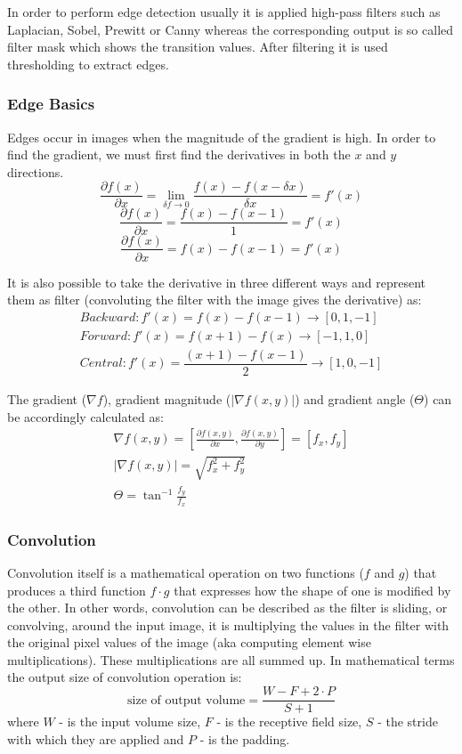 In order to perform edge detection usually it is applied high-pass filters such as Laplacian, Sobel, Prewitt or Canny whereas the corresponding output is so called filter mask which shows the transition values. After filtering it is used thresholding to extract edges.

\subsubsection{Edge Basics}
Edges occur in images when the magnitude of the gradient is high. In order to find the gradient, we must first find the derivatives in both the $x$ and $y$ directions.
\[ \frac{\partial f (x)}{\partial x} = \lim_{\delta{f} \to 0} \dfrac{f(x) - f(x - \delta x)}{\delta x}  = f'(x) \]
\[ \frac{\partial f (x)}{\partial x} = \dfrac{f(x) - f(x - 1)}{1}  = f'(x) \]
\[ \frac{\partial f (x)}{\partial x} = f(x) - f(x - 1) = f'(x) \]

It is also possible to take the derivative in three different ways and represent them as filter (convoluting the filter with the image gives the derivative) as:
\begin{align*}
Backward: f'(x) = f(x) - f(x - 1) \to [0, 1, -1] \\
Forward:  f'(x) = f(x + 1) - f(x) \to [-1, 1, 0] \\
Central:  f'(x) = \dfrac{(x + 1) - f(x - 1)}{2} \to [1, 0, -1]
\end{align*}

The gradient ($\nabla f$), gradient magnitude ($|\nabla f(x, y)|$) and gradient angle ($\Theta$) can be accordingly calculated as: 
\begin{align*}
\nabla f(x, y) = [ \frac{\partial{f (x, y)}}{\partial{x}}, \frac{\partial{f (x, y)}}{\partial{y}} ]  = [f_x, f_y] \\
|\nabla f(x, y)| = \sqrt{f^2_x + f^2_y} \\
\Theta = \tan^{-1} \frac{f_y}{f_x}
\end{align*}

\subsubsection{Convolution}
Convolution itself is a mathematical operation on two functions ($f$ and $g$) that produces a third function $f \cdot g$ that expresses how the shape of one is modified by the other. In other words, convolution can be described as the filter is sliding, or convolving, around the input image, it is multiplying the values in the filter with the original pixel values of the image (aka computing element wise multiplications). These multiplications are all summed up. In mathematical terms the output size of convolution operation is: \[ \text{size of output volume} = \frac{W-F+2 \cdot P}{S+1} \] where $W$ - is the input volume size, $F$ - is the receptive field size, $S$ - the stride with which they are applied and $P$ - is the padding.

